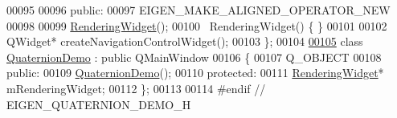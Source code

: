 \begin{DoxyCode}
00095 
00096   \textcolor{keyword}{public}: 
00097     EIGEN\_MAKE\_ALIGNED\_OPERATOR\_NEW
00098     
00099     \hyperlink{class_rendering_widget}{RenderingWidget}();
00100     ~RenderingWidget() \{ \}
00101 
00102     QWidget* createNavigationControlWidget();
00103 \};
00104 
\hyperlink{class_quaternion_demo}{00105} \textcolor{keyword}{class }\hyperlink{class_quaternion_demo}{QuaternionDemo} : \textcolor{keyword}{public} QMainWindow
00106 \{
00107   Q\_OBJECT
00108   \textcolor{keyword}{public}:
00109     \hyperlink{class_quaternion_demo}{QuaternionDemo}();
00110   \textcolor{keyword}{protected}:
00111     \hyperlink{class_rendering_widget}{RenderingWidget}* mRenderingWidget;
00112 \};
00113 
00114 \textcolor{preprocessor}{#endif // EIGEN\_QUATERNION\_DEMO\_H}
\end{DoxyCode}
